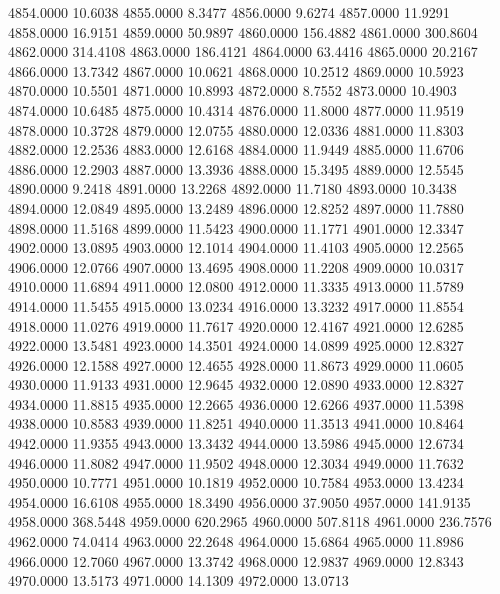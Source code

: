 4854.0000     10.6038
4855.0000      8.3477
4856.0000      9.6274
4857.0000     11.9291
4858.0000     16.9151
4859.0000     50.9897
4860.0000    156.4882
4861.0000    300.8604
4862.0000    314.4108
4863.0000    186.4121
4864.0000     63.4416
4865.0000     20.2167
4866.0000     13.7342
4867.0000     10.0621
4868.0000     10.2512
4869.0000     10.5923
4870.0000     10.5501
4871.0000     10.8993
4872.0000      8.7552
4873.0000     10.4903
4874.0000     10.6485
4875.0000     10.4314
4876.0000     11.8000
4877.0000     11.9519
4878.0000     10.3728
4879.0000     12.0755
4880.0000     12.0336
4881.0000     11.8303
4882.0000     12.2536
4883.0000     12.6168
4884.0000     11.9449
4885.0000     11.6706
4886.0000     12.2903
4887.0000     13.3936
4888.0000     15.3495
4889.0000     12.5545
4890.0000      9.2418
4891.0000     13.2268
4892.0000     11.7180
4893.0000     10.3438
4894.0000     12.0849
4895.0000     13.2489
4896.0000     12.8252
4897.0000     11.7880
4898.0000     11.5168
4899.0000     11.5423
4900.0000     11.1771
4901.0000     12.3347
4902.0000     13.0895
4903.0000     12.1014
4904.0000     11.4103
4905.0000     12.2565
4906.0000     12.0766
4907.0000     13.4695
4908.0000     11.2208
4909.0000     10.0317
4910.0000     11.6894
4911.0000     12.0800
4912.0000     11.3335
4913.0000     11.5789
4914.0000     11.5455
4915.0000     13.0234
4916.0000     13.3232
4917.0000     11.8554
4918.0000     11.0276
4919.0000     11.7617
4920.0000     12.4167
4921.0000     12.6285
4922.0000     13.5481
4923.0000     14.3501
4924.0000     14.0899
4925.0000     12.8327
4926.0000     12.1588
4927.0000     12.4655
4928.0000     11.8673
4929.0000     11.0605
4930.0000     11.9133
4931.0000     12.9645
4932.0000     12.0890
4933.0000     12.8327
4934.0000     11.8815
4935.0000     12.2665
4936.0000     12.6266
4937.0000     11.5398
4938.0000     10.8583
4939.0000     11.8251
4940.0000     11.3513
4941.0000     10.8464
4942.0000     11.9355
4943.0000     13.3432
4944.0000     13.5986
4945.0000     12.6734
4946.0000     11.8082
4947.0000     11.9502
4948.0000     12.3034
4949.0000     11.7632
4950.0000     10.7771
4951.0000     10.1819
4952.0000     10.7584
4953.0000     13.4234
4954.0000     16.6108
4955.0000     18.3490
4956.0000     37.9050
4957.0000    141.9135
4958.0000    368.5448
4959.0000    620.2965
4960.0000    507.8118
4961.0000    236.7576
4962.0000     74.0414
4963.0000     22.2648
4964.0000     15.6864
4965.0000     11.8986
4966.0000     12.7060
4967.0000     13.3742
4968.0000     12.9837
4969.0000     12.8343
4970.0000     13.5173
4971.0000     14.1309
4972.0000     13.0713
